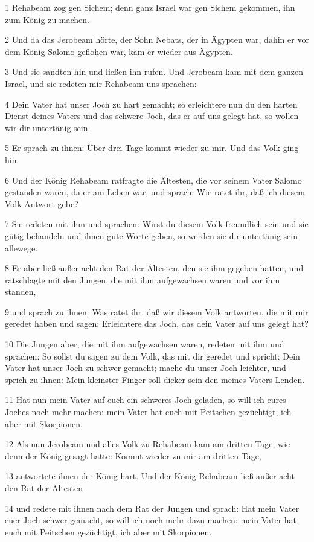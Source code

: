 \par 1 Rehabeam zog gen Sichem; denn ganz Israel war gen Sichem gekommen, ihn zum König zu machen.
\par 2 Und da das Jerobeam hörte, der Sohn Nebats, der in Ägypten war, dahin er vor dem König Salomo geflohen war, kam er wieder aus Ägypten.
\par 3 Und sie sandten hin und ließen ihn rufen. Und Jerobeam kam mit dem ganzen Israel, und sie redeten mir Rehabeam uns sprachen:
\par 4 Dein Vater hat unser Joch zu hart gemacht; so erleichtere nun du den harten Dienst deines Vaters und das schwere Joch, das er auf uns gelegt hat, so wollen wir dir untertänig sein.
\par 5 Er sprach zu ihnen: Über drei Tage kommt wieder zu mir. Und das Volk ging hin.
\par 6 Und der König Rehabeam ratfragte die Ältesten, die vor seinem Vater Salomo gestanden waren, da er am Leben war, und sprach: Wie ratet ihr, daß ich diesem Volk Antwort gebe?
\par 7 Sie redeten mit ihm und sprachen: Wirst du diesem Volk freundlich sein und sie gütig behandeln und ihnen gute Worte geben, so werden sie dir untertänig sein allewege.
\par 8 Er aber ließ außer acht den Rat der Ältesten, den sie ihm gegeben hatten, und ratschlagte mit den Jungen, die mit ihm aufgewachsen waren und vor ihm standen,
\par 9 und sprach zu ihnen: Was ratet ihr, daß wir diesem Volk antworten, die mit mir geredet haben und sagen: Erleichtere das Joch, das dein Vater auf uns gelegt hat?
\par 10 Die Jungen aber, die mit ihm aufgewachsen waren, redeten mit ihm und sprachen: So sollst du sagen zu dem Volk, das mit dir geredet und spricht: Dein Vater hat unser Joch zu schwer gemacht; mache du unser Joch leichter, und sprich zu ihnen: Mein kleinster Finger soll dicker sein den meines Vaters Lenden.
\par 11 Hat nun mein Vater auf euch ein schweres Joch geladen, so will ich eures Joches noch mehr machen: mein Vater hat euch mit Peitschen gezüchtigt, ich aber mit Skorpionen.
\par 12 Als nun Jerobeam und alles Volk zu Rehabeam kam am dritten Tage, wie denn der König gesagt hatte: Kommt wieder zu mir am dritten Tage,
\par 13 antwortete ihnen der König hart. Und der König Rehabeam ließ außer acht den Rat der Ältesten
\par 14 und redete mit ihnen nach dem Rat der Jungen und sprach: Hat mein Vater euer Joch schwer gemacht, so will ich noch mehr dazu machen: mein Vater hat euch mit Peitschen gezüchtigt, ich aber mit Skorpionen.
